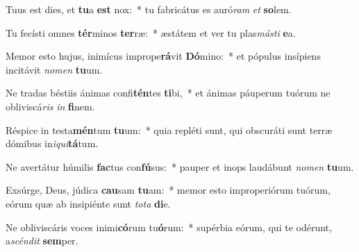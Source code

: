 \item Tuus est dies, et \textbf{tu}a \textbf{est} nox:~* tu fabricátus es auró\textit{ram} \textit{et} \textbf{so}lem.
\item Tu fecísti omnes \textbf{tér}minos \textbf{ter}ræ:~* æstátem et ver tu plas\textit{más}\textit{ti} \textbf{e}a.
\item Memor esto hujus, inimícus imprope\textbf{rá}vit \textbf{Dó}mino:~* et pópulus insípiens incitávit \textit{no}\textit{men} \textbf{tu}um.
\item Ne tradas béstiis ánimas confi\textbf{tén}tes \textbf{ti}bi,~* et ánimas páuperum tuórum ne obliviscá\textit{ris} \textit{in} \textbf{fi}nem.
\item Réspice in testa\textbf{mén}tum \textbf{tu}um:~* quia repléti sunt, qui obscuráti sunt terræ dómibus in\textit{i}\textit{qui}\textbf{tá}tum.
\item Ne avertátur húmilis \textbf{fac}tus con\textbf{fú}sus:~* pauper et inops laudábunt \textit{no}\textit{men} \textbf{tu}um.
\item Exsúrge, Deus, júdica \textbf{cau}sam \textbf{tu}am:~* memor esto improperiórum tuórum, eórum quæ ab insipiénte sunt \textit{to}\textit{ta} \textbf{di}e.
\item Ne obliviscáris voces inimi\textbf{có}rum tu\textbf{ó}rum:~* supérbia eórum, qui te odérunt, a\textit{scén}\textit{dit} \textbf{sem}per.
